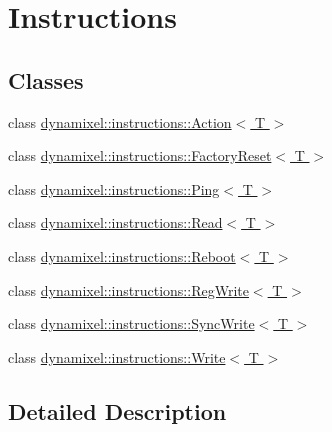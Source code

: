\hypertarget{group__instructions}{}\section{Instructions}
\label{group__instructions}
\subsection*{Classes}
\begin{DoxyCompactItemize}
\item 
class \hyperlink{classdynamixel_1_1instructions_1_1_action}{dynamixel\+::instructions\+::\+Action$<$ T $>$}
\item 
class \hyperlink{classdynamixel_1_1instructions_1_1_factory_reset}{dynamixel\+::instructions\+::\+Factory\+Reset$<$ T $>$}
\item 
class \hyperlink{classdynamixel_1_1instructions_1_1_ping}{dynamixel\+::instructions\+::\+Ping$<$ T $>$}
\item 
class \hyperlink{classdynamixel_1_1instructions_1_1_read}{dynamixel\+::instructions\+::\+Read$<$ T $>$}
\item 
class \hyperlink{classdynamixel_1_1instructions_1_1_reboot}{dynamixel\+::instructions\+::\+Reboot$<$ T $>$}
\item 
class \hyperlink{classdynamixel_1_1instructions_1_1_reg_write}{dynamixel\+::instructions\+::\+Reg\+Write$<$ T $>$}
\item 
class \hyperlink{classdynamixel_1_1instructions_1_1_sync_write}{dynamixel\+::instructions\+::\+Sync\+Write$<$ T $>$}
\item 
class \hyperlink{classdynamixel_1_1instructions_1_1_write}{dynamixel\+::instructions\+::\+Write$<$ T $>$}
\end{DoxyCompactItemize}


\subsection{Detailed Description}
